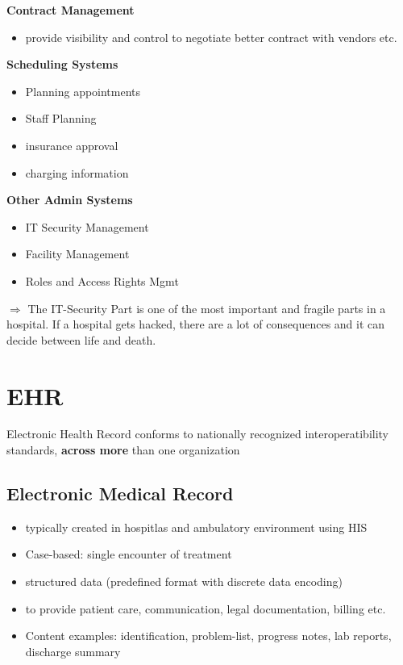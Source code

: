 \documentclass{report}
\theoremstyle{definition}
\theoremstyle{example}
\begin{document}
\textbf{Contract Management}\\
\begin{itemize}
   \item provide visibility and control to negotiate better contract with vendors etc.
\end{itemize}

\textbf{Scheduling Systems}\\
\begin{itemize}
   \item Planning appointments
   \item Staff Planning
   \item insurance approval
   \item charging information
\end{itemize}

\textbf{Other Admin Systems}\\
\begin{itemize}
   \item IT Security Management
   \item Facility Management
   \item Roles and Access Rights Mgmt
\end{itemize}

$\Rightarrow$ The IT-Security Part is one of the most important and fragile parts in a hospital. If a hospital gets hacked, there are a lot of consequences and it can decide between life and death.

\chapter{EHR}
Electronic Health Record conforms to nationally recognized interoperatibility standards, \textbf{across more} than one organization

\section{Electronic Medical Record}
\begin{itemize}
   \item typically created in hospitlas and ambulatory environment using HIS
   \item Case-based: single encounter of treatment
   \item structured data (predefined format with discrete data encoding)
   \item to provide patient care, communication, legal documentation, billing etc.
   \item Content examples: identification, problem-list, progress notes, lab reports, discharge summary
\end{itemize}
\end{document}
